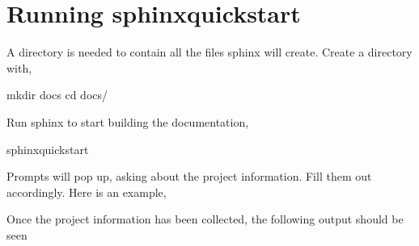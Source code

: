 \documentclass[letterpaper,10pt,english]{sphinxhowto}
\begin{document}
\section{Running sphinx\sphinxhyphen{}quickstart}
\label{\detokenize{index:running-sphinx-quickstart}}
A  directory is needed to contain all the files sphinx will create. Create a  directory with,

\begin{sphinxVerbatim}[commandchars=\\\{\}]
\PYGZdl{} mkdir docs
\PYGZdl{} cd docs/
\end{sphinxVerbatim}

Run sphinx to start building the documentation,

\begin{sphinxVerbatim}[commandchars=\\\{\}]
\PYGZdl{} sphinx\PYGZhy{}quickstart
\end{sphinxVerbatim}

Prompts will pop up, asking about the project information. Fill them out accordingly. Here is an example,

\begin{sphinxVerbatim}[commandchars=\\\{\}]
   
    
   \PYG{p}{[}\PYG{p}{]} 
   \PYG{p}{[}\PYG{p}{]}       
\end{sphinxVerbatim}

Once the project information has been collected, the following output should be seen
\end{document}
